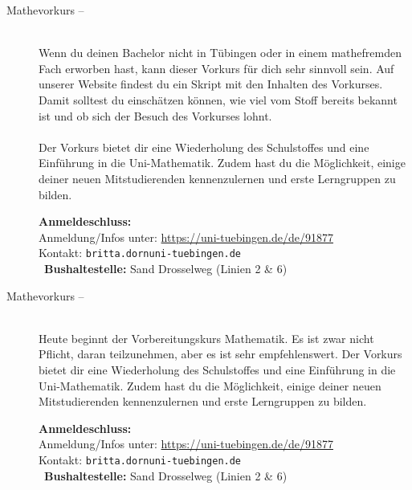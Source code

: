 \begin{description}
\ifmaster
	\ifml %
	\else
		\ifkogwiss %
		\else
			\item[Mathevorkurs -- \mathedatum~\YEAR]~\\
			Wenn du deinen Bachelor nicht in Tübingen oder in einem mathefremden Fach erworben hast, kann dieser Vorkurs für dich sehr sinnvoll sein. Auf unserer Website findest du ein Skript mit den Inhalten des Vorkurses. Damit solltest du einschätzen können, wie viel vom Stoff bereits bekannt ist und ob sich der Besuch des Vorkurses lohnt.\\\\
			Der Vorkurs bietet dir eine Wiederholung des Schulstoffes und eine Einführung in die Uni-Mathematik. Zudem hast du die Möglichkeit, einige deiner neuen Mitstudierenden kennenzulernen und erste Lerngruppen zu bilden.

			\textbf{Anmeldeschluss:} \matheanmeldung\YEAR\\
			Anmeldung/Infos unter: \url{https://uni-tuebingen.de/de/91877}\\
			Kontakt: \texttt{britta.dorn\At uni-tuebingen.de}\\
			\ifsommersemester
			~\textbf{Bushaltestelle:} Sand Drosselweg (Linien 2 \& 6) 
			\fi
		\fi
	\fi
\fi

\ifbachelor
	\item[Mathevorkurs -- \mathedatum~\YEAR]~\\
	Heute beginnt der Vorbereitungskurs Mathematik. Es ist zwar nicht Pflicht, daran teilzunehmen, aber es ist sehr empfehlenswert.
	Der Vorkurs bietet dir eine Wiederholung des Schulstoffes und eine Einführung in die Uni-Mathematik. Zudem hast du die Möglichkeit, einige deiner neuen Mitstudierenden kennenzulernen und erste Lerngruppen zu bilden.

	\textbf{Anmeldeschluss:} \matheanmeldung\YEAR\\
	Anmeldung/Infos unter: \url{https://uni-tuebingen.de/de/91877}\\
	Kontakt: \texttt{britta.dorn\At uni-tuebingen.de}\\
	\ifsommersemester
	~\textbf{Bushaltestelle:} Sand Drosselweg (Linien 2 \& 6) 
	\fi
\fi



\end{description}
